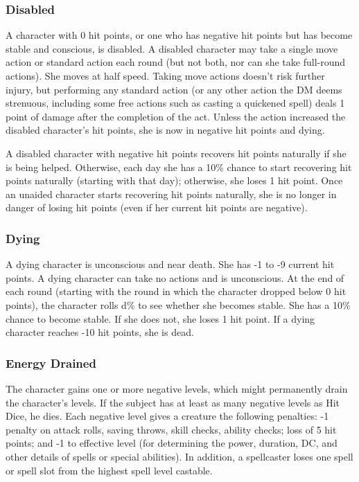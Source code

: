 \subsubsection{Disabled}

A character with 0 hit points, or one who has negative hit points 
but has become stable and conscious, is disabled. A disabled character may take 
a single move action or standard action each round (but not both, nor can she take 
full-round actions). She moves at half speed. Taking move actions doesn't risk 
further injury, but performing any standard action (or any other action the DM 
deems strenuous, including some free actions such as casting a quickened spell) 
deals 1 point of damage after the completion of the act. Unless the action increased 
the disabled character's hit points, she is now in negative hit points and dying.

A disabled character with negative hit points recovers hit points naturally if 
she is being helped. Otherwise, each day she has a 10\% chance to start recovering 
hit points naturally (starting with that day); otherwise, she loses 1 hit point. 
Once an unaided character starts recovering hit points naturally, she is no longer 
in danger of losing hit points (even if her current hit points are negative).

\subsubsection{Dying}

A dying character is unconscious and near death. She has -1 to 
-9 current hit points. A dying character can take no actions and is unconscious. 
At the end of each round (starting with the round in which the character dropped 
below 0 hit points), the character rolls d\% to see whether she becomes stable. 
She has a 10\% chance to become stable. If she does not, she loses 1 hit point. 
If a dying character reaches -10 hit points, she is dead.

\subsubsection{Energy Drained}

The character gains one or more negative levels, which 
might permanently drain the character's levels. If the subject has at least as 
many negative levels as Hit Dice, he dies. Each negative level gives a creature 
the following penalties: -1 penalty on attack rolls, saving throws, skill checks, 
ability checks; loss of 5 hit points; and -1 to effective level (for determining 
the power, duration, DC, and other details of spells or special abilities). In 
addition, a spellcaster loses one spell or spell slot from the highest spell level 
castable.

